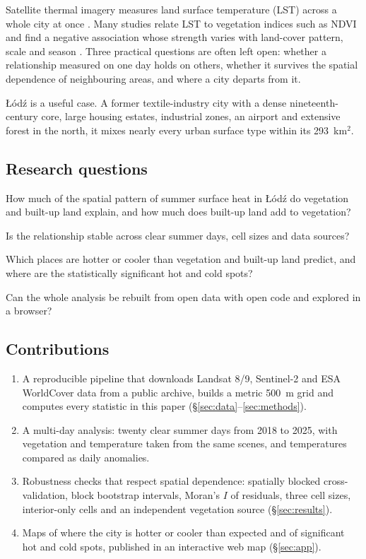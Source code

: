 \documentclass[11pt,a4paper]{article}
\begin{document}
Satellite thermal imagery measures land surface temperature (LST) across a whole city at once \cite{voogt2003}. Many studies relate LST to vegetation indices such as NDVI and find a negative association whose strength varies with land-cover pattern, scale and season \cite{weng2004,zhou2011,peng2012}. Three practical questions are often left open: whether a relationship measured on one day holds on others, whether it survives the spatial dependence of neighbouring areas, and where a city departs from it.

Łódź is a useful case. A former textile-industry city with a dense nineteenth-century core, large housing estates, industrial zones, an airport and extensive forest in the north, it mixes nearly every urban surface type within its 293~km$^2$.

\subsection{Research questions}

\begin{description}[leftmargin=2.6em,style=nextline]
  \item[RQ1] How much of the spatial pattern of summer surface heat in Łódź do vegetation and built-up land explain, and how much does built-up land add to vegetation?
  \item[RQ2] Is the relationship stable across clear summer days, cell sizes and data sources?
  \item[RQ3] Which places are hotter or cooler than vegetation and built-up land predict, and where are the statistically significant hot and cold spots?
  \item[RQ4] Can the whole analysis be rebuilt from open data with open code and explored in a browser?
\end{description}

\subsection{Contributions}

\begin{enumerate}
  \item A reproducible pipeline that downloads Landsat 8/9, Sentinel-2 and ESA WorldCover data from a public archive, builds a metric 500~m grid and computes every statistic in this paper (\S\ref{sec:data}--\ref{sec:methods}).
  \item A multi-day analysis: twenty clear summer days from 2018 to 2025, with vegetation and temperature taken from the same scenes, and temperatures compared as daily anomalies.
  \item Robustness checks that respect spatial dependence: spatially blocked cross-validation, block bootstrap intervals, Moran's $I$ of residuals, three cell sizes, interior-only cells and an independent vegetation source (\S\ref{sec:results}).
  \item Maps of where the city is hotter or cooler than expected and of significant hot and cold spots, published in an interactive web map (\S\ref{sec:app}).
\end{enumerate}
\end{document}
